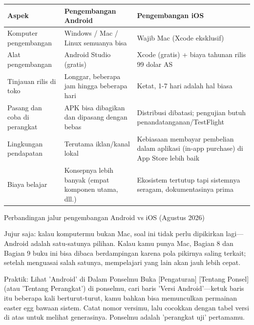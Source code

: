 \begin{center}
\begin{tabularx}{\linewidth}{|X|X|X|}
\hline
\textbf{Aspek} & \textbf{Pengembangan Android} & \textbf{Pengembangan iOS} \tabularnewline
\hline
Komputer pengembangan & Windows / Mac / Linux semuanya bisa & Wajib Mac (Xcode eksklusif) \tabularnewline
Alat pengembangan & Android Studio (gratis) & Xcode (gratis) + biaya tahunan rilis 99 dolar AS \tabularnewline
Tinjauan rilis di toko & Longgar, beberapa jam hingga beberapa hari & Ketat, 1-7 hari adalah hal biasa \tabularnewline
Pasang dan coba di perangkat & APK bisa dibagikan dan dipasang dengan bebas & Distribusi dibatasi; pengujian butuh penandatanganan/TestFlight \tabularnewline
Lingkungan pendapatan & Terutama iklan/kanal lokal & Kebiasaan membayar pembelian dalam aplikasi (in-app purchase) di App Store lebih baik \tabularnewline
Biaya belajar & Konsepnya lebih banyak (empat komponen utama, dll.) & Ekosistem tertutup tapi sistemnya seragam, dokumentasinya prima \tabularnewline
\hline
\end{tabularx}
\end{center}

\begin{center}\small\color{gray}Perbandingan jalur pengembangan Android vs iOS (Agustus 2026)\end{center}

Jujur saja: kalau komputermu bukan Mac, soal ini tidak perlu dipikirkan lagi—Android adalah satu-satunya pilihan. Kalau kamu punya Mac, Bagian 8 dan Bagian 9 buku ini bisa dibaca berdampingan karena pola pikirnya saling terkait; setelah menguasai salah satunya, mempelajari yang lain akan jauh lebih cepat.

\begin{tcbpractice}{Praktik: Lihat 'Android' di Dalam Ponselmu}
Buka [Pengaturan] [Tentang Ponsel] (atau 'Tentang Perangkat') di ponselmu, cari baris 'Versi Android'—ketuk baris itu beberapa kali berturut-turut, kamu bahkan bisa memunculkan permainan easter egg bawaan sistem. Catat nomor versimu, lalu cocokkan dengan tabel versi di atas untuk melihat generasinya. Ponselmu adalah 'perangkat uji' pertamamu.

\end{tcbpractice}

